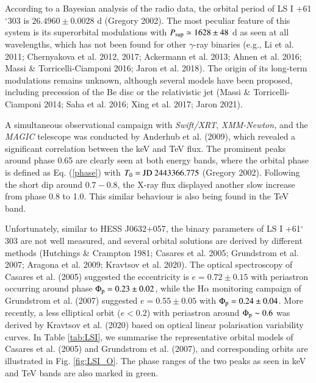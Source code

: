 \documentclass{aa}
\def\HESSJ0632{HESS J0632+057}
\def\LSI61{LS I +61$^{\circ}$303}
\begin{document}
According to a Bayesian analysis of the radio data, the orbital period of \LSI61 is $26.4960\pm0.0028$ d (Gregory 2002). The most peculiar feature of this system is its superorbital modulations with $P_{\rm sup}\simeq1628\pm48$ d as seen at all wavelengths, which has not been found for other $\gamma$-ray binaries (e.g., Li et al. 2011; Chernyakova et al. 2012, 2017; Ackermann et al. 2013; Ahnen et al. 2016; Massi \& Torricelli-Ciamponi 2016; Jaron et al. 2018). The origin of its long-term modulations remains unknown, although several models have been  proposed, including precession of the Be disc or the relativistic jet (Massi \& Torricelli-Ciamponi 2014; Saha et al. 2016; Xing et al. 2017; Jaron 2021).


A simultaneous observational campaign with \textit{Swift/XRT}, \textit{XMM-Newton,} and the \textit{MAGIC} telescope was conducted by Anderhub et al. (2009), which revealed a significant correlation between the keV and TeV flux. The prominent peaks around phase 0.65 are clearly seen at both energy bands, where the orbital phase is defined as Eq. (\ref{phase}) with $T_0={\rm JD}\ 2443366.775$ (Gregory 2002). Following the short dip around $0.7-0.8$, the X-ray flux displayed another slow increase from phase 0.8 to 1.0. This similar behaviour is also being found in the TeV band.

Unfortunately, similar to \HESSJ0632, the binary parameters of \LSI61 are not well measured, and several orbital solutions are derived by different methods (Hutchings \& Crampton 1981; Casares et al. 2005; Grundstrom et al. 2007; Aragona et al. 2009; Kravtsov et al. 2020). The optical spectroscopy of Casares et al. (2005) suggested the eccentricity is $e=0.72\pm0.15$ with periastron occurring around phase $\Phi_{\rm p}=0.23\pm0.02$, while the H$\alpha$ monitoring campaign of Grundstrom et al. (2007) suggested $e=0.55\pm0.05$ with $\Phi_{\rm p}=0.24\pm 0.04$. More recently, a less elliptical orbit ($e<0.2$) with periastron around $\Phi_{\rm p}\sim0.6$ was derived by Kravtsov et al. (2020) based on optical linear polarisation variability curves. In Table \ref{tab:LSI}, we summarise the representative orbital models of Casares et al. (2005) and Grundstrom et al. (2007), and corresponding orbits are illustrated in Fig. \ref{fig:LSI_O}. The phase ranges of the two peaks as seen in keV and TeV bands are also marked in green.
\end{document}

